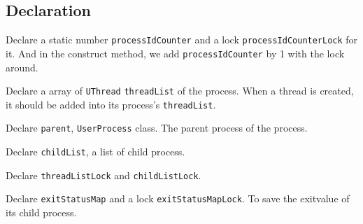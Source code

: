 \documentclass{article}
\begin{document}
\subsection{Declaration}
\begin{compactitem}
\item Declare a static number \texttt{processIdCounter} and a lock \texttt{processIdCounterLock} for it. And in the construct method, we add \texttt{processIdCounter} by 1 with the lock around.
\item Declare a array of \texttt{UThread} \texttt{threadList} of the process. When a thread is created, it should be added into its process's
	\texttt{threadList}.
\item Declare \texttt{parent}, \texttt{UserProcess} class. The parent process of the process.
\item Declare \texttt{childList}, a list of child process.
\item Declare \texttt{threadListLock} and \texttt{childListLock}.
\item Declare \texttt{exitStatusMap} and a lock \texttt{exitStatusMapLock}. To save the exitvalue of its child process.
\end{compactitem}
\end{document}
